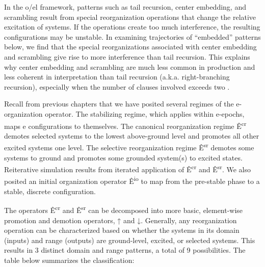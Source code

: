   In the o/el framework, patterns such as tail recursion, center embedding, and scrambling result from special reorganization operations that change the relative excitation of systems. If the operations create too much interference, the resulting configurations may be unstable. In examining trajectories of “embedded” patterns below, we find that the special reorganizations associated with center embedding and scrambling give rise to more interference than tail recursion. This explains why center embedding and scrambling are much less common in production and less coherent in interpretation than tail recursion (a.k.a. right-branching recursion), especially when the number of clauses involved exceeds two \citep{ChristiansenChater1999}. 

  Recall from previous chapters that we have posited several regimes of the e-organization operator. The stabilizing regime, which applies within e-epochs, maps e configurations to themselves. The canonical reorganization regime Ê\textsuperscript{cr} demotes selected systems to the lowest above-ground level and promotes all other excited systems one level. The selective reorganization regime Ê\textsuperscript{sr} demotes some systems to ground and promotes some grounded system(s) to excited states. Reiterative simulation results from iterated application of Ê\textsuperscript{cr} and Ê\textsuperscript{sr}. We also posited an initial organization operator Ê\textsuperscript{io} to map from the pre-stable phase to a stable, discrete configuration.

  The operators Ê\textsuperscript{cr} and Ê\textsuperscript{sr} can be decomposed into more basic, element-wise promotion and demotion operators, ↑ and ↓. Generally, any reorganization operation can be characterized based on whether the systems in its domain (inputs) and range (outputs) are ground-level, excited, or selected systems. This results in 3 distinct domain and range patterns, a total of 9 possibilities. The table below summarizes the classification:

